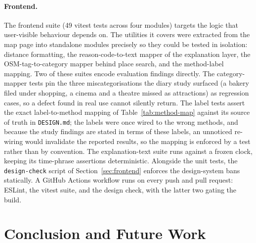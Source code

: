 \documentclass[acmlarge]{acmart}
\begin{document}
\paragraph{Frontend.}
The frontend suite (49 vitest tests across four modules) targets the logic
that user-visible behaviour depends on. The utilities it covers were extracted from the map page into
standalone modules precisely so they could be tested in isolation:
distance formatting, the reason-code-to-text mapper of the explanation
layer, the OSM-tag-to-category mapper behind place search, and the
method-label mapping. Two of these suites encode evaluation findings
directly. The category-mapper tests pin the three miscategorisations the
diary study surfaced (a bakery filed under shopping, a cinema and a
theatre missed as attractions) as regression cases, so a defect found in
real use cannot silently return. The label tests assert the exact
label-to-method mapping of Table~\ref{tab:method-map} against its source
of truth in \texttt{DESIGN.md}; the labels were once wired to the wrong
methods, and because the study findings are stated in terms of these
labels, an unnoticed re-wiring would invalidate the reported results, so
the mapping is enforced by a test rather than by convention. The explanation-text suite
runs against a frozen clock, keeping its time-phrase assertions
deterministic. Alongside the unit tests, the \texttt{design-check} script
of Section~\ref{sec:frontend} enforces the design-system bans statically.
A GitHub Actions workflow runs on every push and pull request: ESLint,
the vitest suite, and the design check, with the latter two gating the
build.

\section{Conclusion and Future Work}
\label{sec:conclusion}
\end{document}

